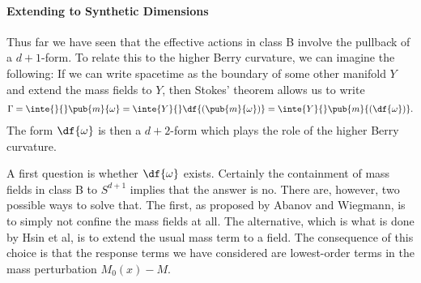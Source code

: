 \paragraph{Extending to Synthetic Dimensions}
Thus far we have seen that the effective actions in class B involve the pullback of a $d + 1$-form. To relate this to the higher Berry curvature, we can imagine the following: If we can write spacetime as the boundary of some other manifold $Y$ and extend the mass fields to $Y$, then Stokes' theorem allows us to write
\begin{align*}
	\Gamma = \inte{}{}\pub{m}{\omega} = \inte{Y}{}\df{(\pub{m}{\omega})} = \inte{Y}{}\pub{m}{(\df{\omega})}.
\end{align*}
The form $\df{\omega}$ is then a $d + 2$-form which plays the role of the higher Berry curvature.

A first question is whether $\df{\omega}$ exists. Certainly the containment of mass fields in class B to $S^{d + 1}$ implies that the answer is no. There are, however, two possible ways to solve that. The first, as proposed by Abanov and Wiegmann, is to simply not confine the mass fields at all. The alternative, which is what is done by Hsin et al, is to extend the usual mass term to a field. The consequence of this choice is that the response terms we have considered are lowest-order terms in the mass perturbation $M_{0}(x) - M$.
